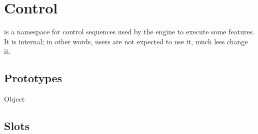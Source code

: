 
\section{Control}

 is a namespace for control sequences used by the \urbi
engine to execute some \us features.  It is internal; in other words, users
are not expected to use it, much less change it.

\subsection{Prototypes}

\begin{refObjects}
\item[Object]
\end{refObjects}

\subsection{Slots}

